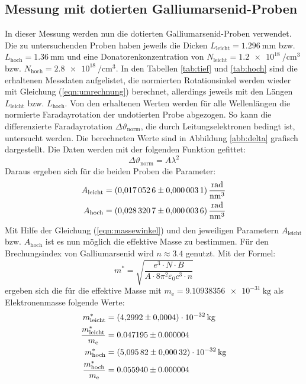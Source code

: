\subsection{Messung mit dotierten Galliumarsenid-Proben}
\label{sec:dot}
In dieser Messung werden nun die dotierten Galliumarsenid-Proben verwendet.
Die zu untersuchenden Proben haben jeweils die Dicken $L_{\mathrm{leicht}}=\SI{1.296}{\milli\meter}$ bzw. $L_{\mathrm{hoch}}=\SI{1.36}{\milli\meter}$ und eine Donatorenkonzentration von $N_{\mathrm{leicht}}=\SI{1.2 e18}{\per\centi\cubic\meter}$ bzw. $N_{\mathrm{hoch}}=\SI{2.8 e18}{\per\centi\cubic\meter}$.
In den Tabellen \ref{tab:tief} und \ref{tab:hoch} sind die erhaltenen Messdaten aufgelistet, die normierten Rotationsinkel werden wieder mit Gleichung (\ref{eqn:umrechnung}) berechnet, allerdings jeweils mit den Längen $L_{\mathrm{leicht}}$ bzw. $L_{\mathrm{hoch}}$.
Von den erhaltenen Werten werden für alle Wellenlängen die normierte Faradayrotation der undotierten Probe abgezogen.
So kann die differenzierte Faradayrotation $\Delta\vartheta_\mathrm{norm}$, die durch Leitungselektronen bedingt ist, untersucht werden.
Die berechneten Werte sind in Abbildung \ref{abb:delta} grafisch dargestellt.
Die Daten werden mit der folgenden Funktion gefittet:
\begin{equation}
  \Delta\vartheta_{\mathrm{norm}} = A\lambda^2
\end{equation}
Daraus ergeben sich für die beiden Proben die Parameter:
\begin{align*}
  A_{\mathrm{leicht}} &= \SI{0.0170526 \pm 0.0000031}{\radian\per\nano\cubic\meter} \\
  A_{\mathrm{hoch}} &= \SI{0.0283207 \pm 0.0000036}{\radian\per\nano\cubic\meter}
\end{align*}
Mit Hilfe der Gleichung (\ref{eqn:massewinkel}) und den jeweiligen Parametern $A_{\mathrm{leicht}}$ bzw. $A_{\mathrm{hoch}}$ ist es nun möglich die effektive Masse zu bestimmen.
Für den Brechungsindex von Galliumarsenid wird $n \approx 3.4$ \cite{nGaAs} genutzt.
Mit der Formel:
\begin{equation}
  m^*=\sqrt{\frac{e^3\cdot N \cdot B}{A\cdot 8\pi^2\varepsilon_\mathrm{0} c^3 \cdot n }}
\end{equation}
ergeben sich die für die effektive Masse mit $m_\mathrm{e} = \SI{9.10938356 e-31}{\kilogram}$ als Elektronenmasse folgende Werte:
\begin{align*}
  m^*_{\mathrm{leicht}} &= \SI{4.2992 \pm 0.0004 e-32}{\kilogram} \\
  \frac{m^*_{\mathrm{leicht}}}{m_\mathrm{e}} &= 0.047195\pm 0.000004 \\
  m^*_{\mathrm{hoch}} &= \SI{5.09582 \pm 0.00032 e-32}{\kilogram} \\
  \frac{m^*_{\mathrm{hoch}}}{m_\mathrm{e}} &= 0.055940\pm 0.000004\\
\end{align*}


